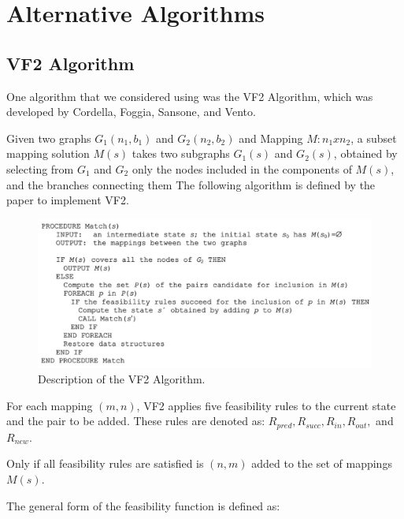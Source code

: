 \documentclass{article}
\begin{document}
\section{Alternative Algorithms}

  \subsection{VF2 Algorithm}

  One algorithm that we considered using was the VF2 Algorithm, which was developed by Cordella, Foggia, Sansone, and Vento.

  Given two graphs $G_1(n_1,b_1)$ and $G_2(n_2,b_2)$ and Mapping $M : n_1 x n_2$, a subset mapping solution $M(s)$ takes two subgraphs $G_1(s)$ and $G_2(s)$, obtained by selecting from $G_1$ and $G_2$
  only the nodes included in the components of $M(s)$, and the branches connecting them
  The following algorithm is defined by the paper to implement VF2.

  \begin{figure}[H]
    \centering
    \includegraphics[scale=0.7]{images/vf2_rules.png}
    \caption{Description of the VF2 Algorithm.}
    \label{fig:vf2algo}
  \end{figure}

  For each mapping $(m,n)$, VF2 applies five feasibility rules to the current state and the pair to be added. These rules are denoted as: $R_{pred}, R_{succ}, R_{in}, R_{out},$ and $R_{new}$.

  Only if all feasibility rules are satisfied is $(n,m)$ added to the set of mappings $M(s)$.

  The general form of the feasibility function is defined as:
\end{document}
